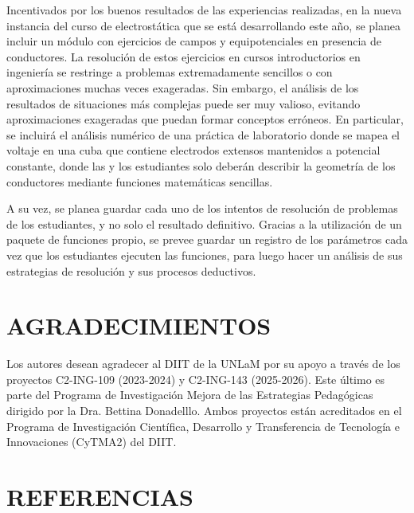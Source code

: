 \documentclass[a4paper]{fodami}        %
\begin{document}
Incentivados por los buenos resultados de las experiencias realizadas, en la nueva instancia del curso de electrostática que se está desarrollando este año, se planea incluir un módulo con ejercicios de campos y equipotenciales en presencia de conductores. La resolución de estos ejercicios en cursos introductorios en ingeniería se restringe a problemas extremadamente sencillos o con aproximaciones muchas veces exageradas. Sin embargo, el análisis de los resultados de situaciones más complejas puede ser muy valioso, evitando aproximaciones exageradas que puedan formar conceptos erróneos. En particular, se incluirá el análisis numérico de una práctica de laboratorio donde se mapea el voltaje en una cuba que contiene electrodos extensos mantenidos a potencial constante, donde las y los estudiantes solo deberán describir la geometría de los conductores mediante funciones matemáticas sencillas.

A su vez, se planea guardar cada uno de los intentos de resolución de problemas de los estudiantes, y no solo el resultado definitivo. Gracias a la utilización de un paquete de funciones propio, se prevee guardar un registro de los parámetros cada vez que los estudiantes ejecuten las funciones, para luego hacer un análisis de sus estrategias de resolución y sus procesos deductivos.

\section{AGRADECIMIENTOS}

Los autores desean agradecer al DIIT de la UNLaM por su apoyo a través de los proyectos C2-ING-109 (2023-2024) y C2-ING-143 (2025-2026).
Este último es parte del Programa de Investigación Mejora de las Estrategias Pedagógicas dirigido por la Dra. Bettina Donadelllo.
Ambos proyectos están acreditados en el Programa de Investigación Científica, Desarrollo y Transferencia de Tecnología e Innovaciones (CyTMA2) del DIIT.


\section{REFERENCIAS}
\end{document}
